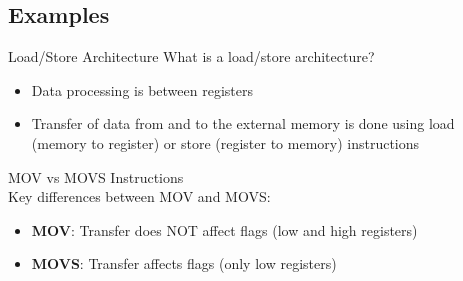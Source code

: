\columnbreak

\subsection{Examples}

\begin{example2}{Load/Store Architecture}
What is a load/store architecture?
\begin{itemize}
  \item Data processing is between registers
  \item Transfer of data from and to the external memory is done using load (memory to register) or store (register to memory) instructions
\end{itemize}
\end{example2}

\begin{example2}{MOV vs MOVS Instructions}\\
Key differences between MOV and MOVS:
\begin{itemize}
  \item \textbf{MOV}: Transfer does NOT affect flags (low and high registers)
  \item \textbf{MOVS}: Transfer affects flags (only low registers)
\end{itemize}
\end{example2}



